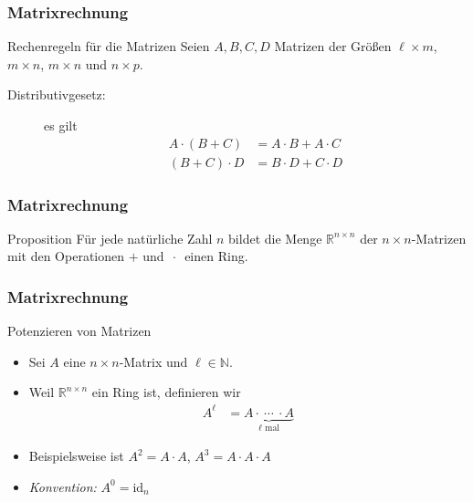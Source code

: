 \documentclass{beamer}
\renewcommand{\emph}[1]{{\textcolor{solarizedRed}{\itshape #1}}}
\newcommand\NN{\mathbb N}
\newcommand\RR{\mathbb R}
\newcommand{\id}{\mathrm{id}}
\renewcommand{\oe}{\"o}
\newcommand{\ue}{\"u}
\newcommand{\mytitle}{Matrixrechnung}
\begin{document}
\begin{frame}\frametitle{\mytitle}
	\begin{block}{Rechenregeln f\ue r die Matrizen}
Seien $A,B,C,D$ Matrizen der Gr\oe\ss en $\ell\times m$, $m\times n$, $m\times n$ und $n\times p$.
		\begin{description}
			\item[Distributivgesetz:] es gilt 
				\begin{align*}
					A\cdot(B+C)&=A\cdot B+A\cdot C\\
					(B+C)\cdot D&=B\cdot D+C\cdot D
				\end{align*}
		\end{description}
	\end{block}
\end{frame}

\begin{frame}\frametitle{\mytitle}
	\begin{block}{Proposition}
		F\ue r jede nat\ue rliche Zahl $n$ bildet die Menge $\RR^{n\times n}$ der $n\times n$-Matrizen mit den Operationen $+$ und $\,\cdot\,$ einen Ring.
	\end{block}
\end{frame}

\begin{frame}\frametitle{\mytitle}
	\begin{block}{Potenzieren von Matrizen}
	\begin{itemize}
	\item Sei $A$ eine $n\times n$-Matrix und $\ell\in\NN$.
	\item Weil $\RR^{n\times n}$ ein Ring ist, definieren wir
		\begin{align*}
			A^\ell&=\underbrace{A\cdot\ \cdots\ \cdot A}_{\mbox{$\ell$ mal}}
		\end{align*}
	\item Beispielsweise ist $A^2=A\cdot A$, $A^3=A\cdot A\cdot A$
	\item \emph{Konvention:} $A^0=\id_n$
	\end{itemize}
	\end{block}
\end{frame}
\end{document}
